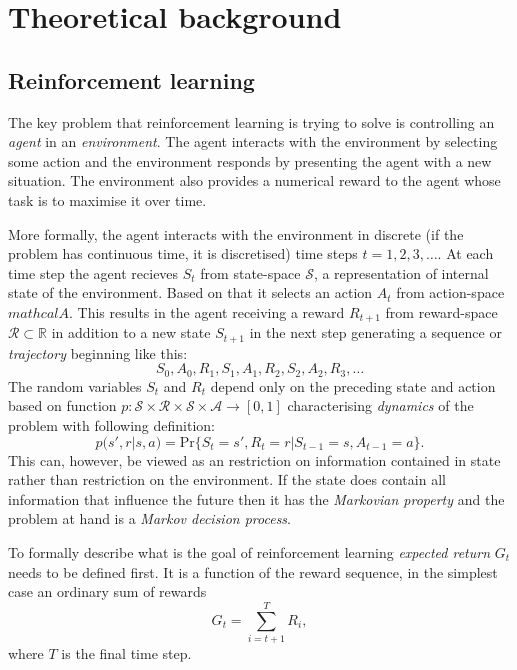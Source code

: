 \chapter{Theoretical background}


\section{Reinforcement learning}
\label{sec:reinf}
The key problem that reinforcement learning is trying to solve is controlling an \emph{agent} in an \emph{environment}. The agent interacts with the environment by selecting some action and the environment responds by presenting the agent with a new situation. The environment also provides a numerical reward to the agent whose task is to maximise it over time. \cite{Sutton1998}

More formally, the agent interacts with the environment in discrete (if the problem has continuous time, it is discretised) time steps $t=1,2,3,\dots$. At each time step the agent recieves $S_t$ from state-space $\mathcal{S}$, a representation of internal state of the environment. Based on that it selects an action $A_t$ from action-space $mathcal{A}$. This results in the agent receiving a reward $R_{t+1}$ from reward-space $\mathcal{R}\subset \mathbb{R}$ in addition to a new state $S_{t+1}$ in the next step generating a sequence or \emph{trajectory} beginning like this:
\begin{equation}
    S_0,A_0,R_1,S_1,A_1,R_2,S_2,A_2,R_3,\dots
\end{equation}
The random variables $S_t$ and $R_t$ depend only on the preceding state and action based on function $p: \mathcal{S} \times \mathcal{R} \times \mathcal{S} \times\mathcal{A} \rightarrow [0,1]$ characterising \emph{dynamics} of the problem with following definition:
\begin{equation}
    p(s',r|s,a) = \text{Pr}\{S_t=s',R_t=r|S_{t-1}=s, A_{t-1}=a\}.
\end{equation}
This can, however, be viewed as an restriction on information contained in state rather than restriction on the environment. If the state does contain all information that influence the future then it has the \emph{Markovian property} and the problem at hand is a \emph{Markov decision process}.

To formally describe what is the goal of reinforcement learning \emph{expected return} $G_t$ needs to be defined first. It is a function of the reward sequence, in the simplest case an ordinary sum of rewards 
\begin{equation}
    \label{eq:exp-ret}
    G_t = \sum_{i=t+1}^TR_i,
\end{equation}
where $T$ is the final time step. 

